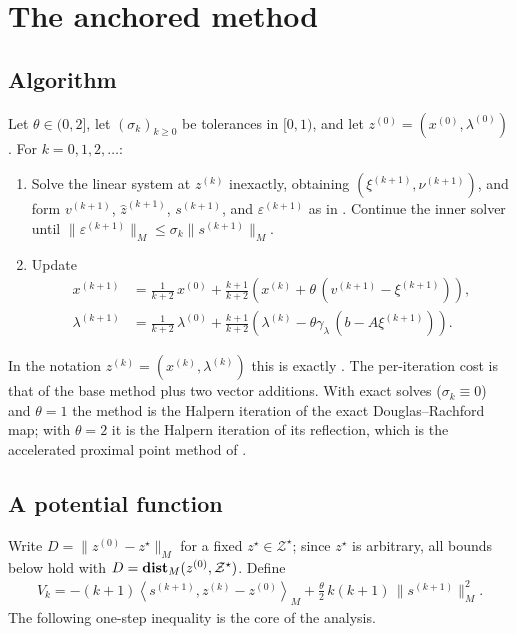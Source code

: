\section{The anchored method}\label{sec:acc-anchored}

\subsection{Algorithm}
Let $\theta \in (0,2]$, let $(\sigma_k)_{k \ge 0}$ be tolerances in $[0,1)$, and let $z^{(0)} = (x^{(0)}, \lambda^{(0)})$.
For $k = 0, 1, 2, \ldots$:
\begin{enumerate}
    \item Solve the linear system  at $z^{(k)}$ inexactly, obtaining $(\xi^{(k+1)}, \nu^{(k+1)})$, and form $v^{(k+1)}$, $\hat z^{(k+1)}$, $s^{(k+1)}$, and $\varepsilon^{(k+1)}$ as in .
    Continue the inner solver until $\|\varepsilon^{(k+1)}\|_M \le \sigma_k\|s^{(k+1)}\|_M$.
    \item Update
    \begin{subequations}\label{eq:acc-anchored-xy}
    \begin{align}
        x^{(k+1)} &= \frac{1}{k+2}\, x^{(0)} + \frac{k+1}{k+2}\left(x^{(k)} + \theta\,(v^{(k+1)} - \xi^{(k+1)})\right), \\
        \lambda^{(k+1)} &= \frac{1}{k+2}\, \lambda^{(0)} + \frac{k+1}{k+2}\left(\lambda^{(k)} - \theta\gamma_\lambda\,(b - A\xi^{(k+1)})\right).
    \end{align}
    \end{subequations}
\end{enumerate}
In the notation $z^{(k)} = (x^{(k)}, \lambda^{(k)})$ this is exactly .
The per-iteration cost is that of the base method plus two vector additions.
With exact solves ($\sigma_k \equiv 0$) and $\theta = 1$ the method is the Halpern iteration of the exact Douglas--Rachford map; with $\theta = 2$ it is the Halpern iteration of its reflection, which is the accelerated proximal point method of \citet{kim2021accelerated}.

\subsection{A potential function}
Write $D = \|z^{(0)} - z^\star\|_M$ for a fixed $z^\star \in \mathcal{Z}^\star$; since $z^\star$ is arbitrary, all bounds below hold with $D = \mathop{\bf dist{}}_M(z^{(0)}, \mathcal{Z}^\star)$.
Define
\begin{align}
    V_k = -(k+1)\left\langle s^{(k+1)}, z^{(k)} - z^{(0)}\right\rangle_M + \frac{\theta}{2}\, k(k+1)\, \|s^{(k+1)}\|_M^2. \label{eq:acc-potential}
\end{align}
The following one-step inequality is the core of the analysis.

